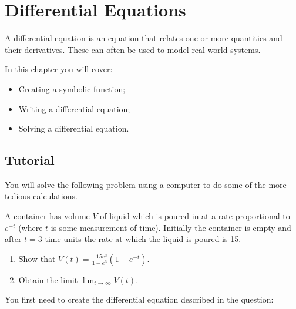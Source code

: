 \chapter{Differential Equations}
\label{chp:differential_equations}

A differential equation is an equation that relates one or more quantities and
their derivatives. These can often be used to model real world systems.

\begin{note}
In this chapter you will cover:
\begin{itemize}
\item 

Creating a symbolic function;

\item 

Writing a differential equation;

\item 

Solving a differential equation.

\end{itemize}
\end{note}





\section{Tutorial}

You will solve the following problem using a computer to do some of the more
tedious calculations.

A container has volume \(V\) of liquid which is poured in at a rate proportional
to \(e^{-t}\) (where \(t\) is some measurement of time). Initially the container is empty and
after \(t=3\) time units the rate at which the liquid is poured is 15.
\begin{enumerate}

\item 

Show that \(V(t)=\frac{-15e^{3}}{1-e^{3}}(1 - e^{-t})\).

\item 

Obtain the limit \(\lim_{t\to \infty}V(t)\).

\end{enumerate}



You first need to create the differential equation described in the question:

